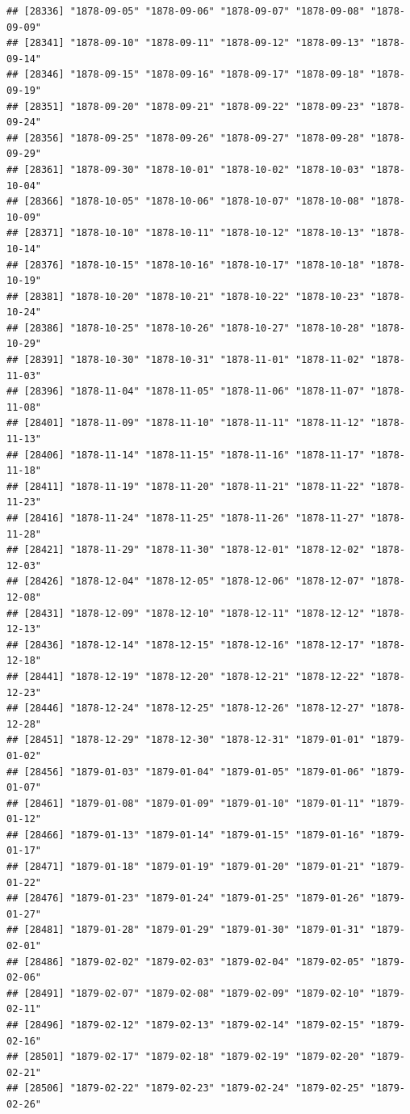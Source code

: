 \documentclass{article}\usepackage[]{graphicx}\usepackage[]{color}
\makeatletter
\newenvironment{kframe}{%
 \def\at@end@of@kframe{}%
 \ifinner\ifhmode%
  \def\at@end@of@kframe{\end{minipage}}%
  \begin{minipage}{\columnwidth}%
 \fi\fi%
 \def\FrameCommand##1{\hskip\@totalleftmargin \hskip-\fboxsep
 \colorbox{shadecolor}{##1}\hskip-\fboxsep
     \hskip-\linewidth \hskip-\@totalleftmargin \hskip\columnwidth}%
 \MakeFramed {\advance\hsize-\width
   \@totalleftmargin\z@ \linewidth\hsize
   \@setminipage}}%
 {\par\unskip\endMakeFramed%
 \at@end@of@kframe}
\newenvironment{knitrout}{}{} %
\makeatother
\begin{document}
\begin{description}
\begin{knitrout}
\begin{kframe}
\begin{verbatim}
## [28336] "1878-09-05" "1878-09-06" "1878-09-07" "1878-09-08" "1878-09-09"
## [28341] "1878-09-10" "1878-09-11" "1878-09-12" "1878-09-13" "1878-09-14"
## [28346] "1878-09-15" "1878-09-16" "1878-09-17" "1878-09-18" "1878-09-19"
## [28351] "1878-09-20" "1878-09-21" "1878-09-22" "1878-09-23" "1878-09-24"
## [28356] "1878-09-25" "1878-09-26" "1878-09-27" "1878-09-28" "1878-09-29"
## [28361] "1878-09-30" "1878-10-01" "1878-10-02" "1878-10-03" "1878-10-04"
## [28366] "1878-10-05" "1878-10-06" "1878-10-07" "1878-10-08" "1878-10-09"
## [28371] "1878-10-10" "1878-10-11" "1878-10-12" "1878-10-13" "1878-10-14"
## [28376] "1878-10-15" "1878-10-16" "1878-10-17" "1878-10-18" "1878-10-19"
## [28381] "1878-10-20" "1878-10-21" "1878-10-22" "1878-10-23" "1878-10-24"
## [28386] "1878-10-25" "1878-10-26" "1878-10-27" "1878-10-28" "1878-10-29"
## [28391] "1878-10-30" "1878-10-31" "1878-11-01" "1878-11-02" "1878-11-03"
## [28396] "1878-11-04" "1878-11-05" "1878-11-06" "1878-11-07" "1878-11-08"
## [28401] "1878-11-09" "1878-11-10" "1878-11-11" "1878-11-12" "1878-11-13"
## [28406] "1878-11-14" "1878-11-15" "1878-11-16" "1878-11-17" "1878-11-18"
## [28411] "1878-11-19" "1878-11-20" "1878-11-21" "1878-11-22" "1878-11-23"
## [28416] "1878-11-24" "1878-11-25" "1878-11-26" "1878-11-27" "1878-11-28"
## [28421] "1878-11-29" "1878-11-30" "1878-12-01" "1878-12-02" "1878-12-03"
## [28426] "1878-12-04" "1878-12-05" "1878-12-06" "1878-12-07" "1878-12-08"
## [28431] "1878-12-09" "1878-12-10" "1878-12-11" "1878-12-12" "1878-12-13"
## [28436] "1878-12-14" "1878-12-15" "1878-12-16" "1878-12-17" "1878-12-18"
## [28441] "1878-12-19" "1878-12-20" "1878-12-21" "1878-12-22" "1878-12-23"
## [28446] "1878-12-24" "1878-12-25" "1878-12-26" "1878-12-27" "1878-12-28"
## [28451] "1878-12-29" "1878-12-30" "1878-12-31" "1879-01-01" "1879-01-02"
## [28456] "1879-01-03" "1879-01-04" "1879-01-05" "1879-01-06" "1879-01-07"
## [28461] "1879-01-08" "1879-01-09" "1879-01-10" "1879-01-11" "1879-01-12"
## [28466] "1879-01-13" "1879-01-14" "1879-01-15" "1879-01-16" "1879-01-17"
## [28471] "1879-01-18" "1879-01-19" "1879-01-20" "1879-01-21" "1879-01-22"
## [28476] "1879-01-23" "1879-01-24" "1879-01-25" "1879-01-26" "1879-01-27"
## [28481] "1879-01-28" "1879-01-29" "1879-01-30" "1879-01-31" "1879-02-01"
## [28486] "1879-02-02" "1879-02-03" "1879-02-04" "1879-02-05" "1879-02-06"
## [28491] "1879-02-07" "1879-02-08" "1879-02-09" "1879-02-10" "1879-02-11"
## [28496] "1879-02-12" "1879-02-13" "1879-02-14" "1879-02-15" "1879-02-16"
## [28501] "1879-02-17" "1879-02-18" "1879-02-19" "1879-02-20" "1879-02-21"
## [28506] "1879-02-22" "1879-02-23" "1879-02-24" "1879-02-25" "1879-02-26"

\end{verbatim}
\end{kframe}
\end{knitrout}
\end{description}
\end{document}
